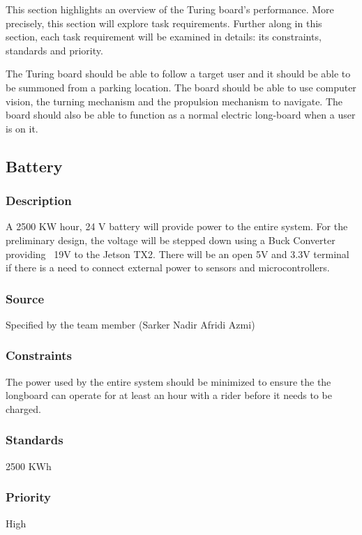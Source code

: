 This section highlights an overview of the Turing board's performance. More precisely, this section will explore task requirements. Further along in this section, each task requirement will be examined in details: its constraints, standards and priority.

The Turing board should be able to follow a target user and it should be able to be summoned from a parking location. The board should be able to use computer vision, the turning mechanism and the propulsion mechanism to navigate. The board should also be able to function as a normal electric long-board when a user is on it.

\subsection{Battery}
\subsubsection{Description}
A 2500 KW hour, 24 V battery will provide power to the entire system. For the preliminary design, the voltage will be stepped down using a Buck Converter providing ~19V to the Jetson TX2. There will be an open 5V and 3.3V terminal if there is a need to connect external power to sensors and microcontrollers.
\subsubsection{Source}
Specified by the team member (Sarker Nadir Afridi Azmi)
\subsubsection{Constraints}
The power used by the entire system should be minimized to ensure the the longboard can operate for at least an hour with a rider before it needs to be charged.
\subsubsection{Standards}
2500 KWh
\subsubsection{Priority}
High